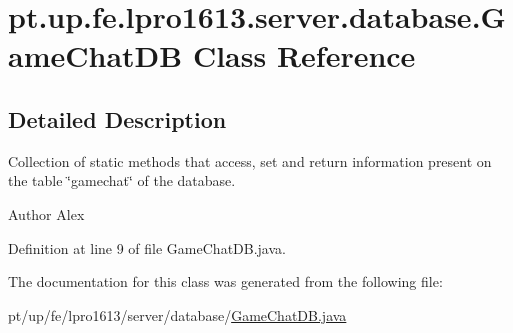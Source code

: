 \hypertarget{classpt_1_1up_1_1fe_1_1lpro1613_1_1server_1_1database_1_1_game_chat_d_b}{}\section{pt.\+up.\+fe.\+lpro1613.\+server.\+database.\+Game\+Chat\+DB Class Reference}
\label{classpt_1_1up_1_1fe_1_1lpro1613_1_1server_1_1database_1_1_game_chat_d_b}


\subsection{Detailed Description}
Collection of static methods that access, set and return information present on the table \char`\"{}gamechat\char`\"{} of the database.

\begin{DoxyAuthor}{Author}
Alex 
\end{DoxyAuthor}


Definition at line 9 of file Game\+Chat\+D\+B.\+java.



The documentation for this class was generated from the following file\+:\begin{DoxyCompactItemize}
\item 
pt/up/fe/lpro1613/server/database/\hyperlink{_game_chat_d_b_8java}{Game\+Chat\+D\+B.\+java}\end{DoxyCompactItemize}
